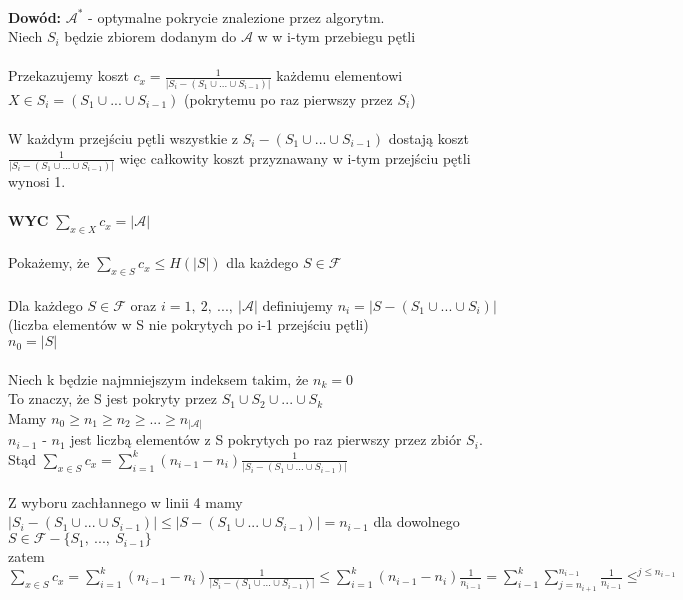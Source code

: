 \\
\textbf{Dowód: }$\mathcal{A}^{\ast}$ - optymalne pokrycie znalezione przez algorytm.\\
\tab Niech $S_i$ będzie zbiorem dodanym do $\mathcal{A}$ w w i-tym przebiegu pętli\\\\
Przekazujemy koszt $c_x=\frac{1}{\vert S_i-(S_1\cup ... \cup S_{i-1})\vert}$ każdemu elementowi $X\in S_i = (S_1 \cup ... \cup S_{i-1})$ (pokrytemu po raz pierwszy przez $S_i$)\\
\\
\tab W każdym przejściu pętli wszystkie z $S_i - (S_1 \cup ... \cup S_{i-1})$ dostają koszt $\frac{1}{\vert S_i-(S_1\cup ... \cup S_{i-1})\vert}$ więc całkowity koszt przyznawany w i-tym przejściu pętli wynosi 1.\\\\
\textbf{WYC} $\sum_{x\in X}c_x=\vert \mathcal{A}\vert$\\
\\
Pokażemy, że $\sum_{x\in S}c_x \leq H(\vert S\vert)$ dla każdego $S\in \mathcal{F}$\\
\\
Dla każdego $S\in \mathcal{F}$ oraz $i=1,\ 2,\ ...,\ \vert\mathcal{A}\vert$ definiujemy $n_i = \vert S - (S_1 \cup ... \cup S_i)\vert$ (liczba elementów w S nie pokrytych po i-1 przejściu pętli)\\
\tab $n_0=\vert S\vert$\\
\\
Niech k będzie najmniejszym indeksem takim, że $n_k=0$\\
\tab To znaczy, że S jest pokryty przez $S_1 \cup S_2 \cup ... \cup S_k$\\
Mamy $n_0\geq n_1\geq n_2\geq ...\geq n_{\vert\mathcal{A}\vert}$\\
\tab $n_{i-1}$ - $n_1$ jest liczbą elementów z S pokrytych po raz pierwszy przez zbiór $S_i$.\\
Stąd $\sum_{x\in S}c_x = \sum_{i=1}^{k}(n_{i-1}-n_i)\frac{1}{\vert S_i - (S_1 \cup ... \cup S_{i-1})\vert}$\\\\
Z wyboru zachłannego w linii 4 mamy $\vert S_i - (S_1 \cup ... \cup S_{i-1})\vert \leq \vert S - (S_1 \cup ... \cup S_{i-1})\vert = n_{i-1}$ dla dowolnego $S \in \mathcal{F} - \lbrace S_1,\ ...,\ S_{i-1}\rbrace$\\
\tab zatem\\
$\sum_{x\in S} c_x = \sum_{i=1}^{k} (n_{i-1}-n_i)\frac{1}{\vert S_i - (S_1 \cup ... \cup S_{i-1})\vert} \leq \sum_{i=1}^{k}(n_{i-1}- n_i)\frac{1}{n_{i-1}}=\sum_{i-1}^{k}\sum_{j=n_{i+1}}^{n_{i-1}}\frac{1}{n_{i-1}}\leq^{j\leq n_{i-1}}$\\
